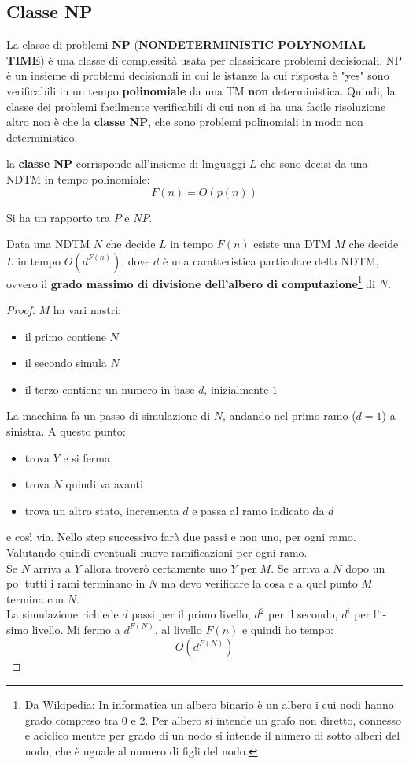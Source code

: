 \subsection{Classe NP}
La classe di problemi \textbf{NP} (\textbf{NONDETERMINISTIC POLYNOMIAL TIME}) è una classe di complessità usata per classificare problemi decisionali. NP è un insieme di problemi decisionali in cui le istanze la cui risposta è "yes" sono verificabili in un tempo \textbf{polinomiale} da una TM \textbf{non} deterministica.
Quindi, la classe dei problemi facilmente verificabili di cui non si ha una facile
risoluzione altro non è che la \textbf{classe NP}, che sono problemi polinomiali
in modo non deterministico.
\begin{definizione}
  la \textbf{classe NP} corrisponde all'insieme di linguaggi $L$ che sono decisi
  da una NDTM in tempo polinomiale:
  \[F(n)=O(p(n))\]
\end{definizione}
Si ha un rapporto tra $P$ e $NP$.
\begin{definizione}
  Data una NDTM $N$ che decide $L$ in tempo $F(n)$ esiste una DTM $M$ che decide
  $L$ in tempo $O(d^{F(n)})$, dove $d$ è una caratteristica particolare della
  NDTM, ovvero il \textbf{grado massimo di divisione dell'albero di
    computazione}\footnote{Da Wikipedia: In informatica un albero binario è un albero i cui nodi hanno grado compreso tra 0 e 2. Per albero si intende un grafo non diretto, connesso e aciclico mentre per grado di un nodo si intende il numero di sotto alberi del nodo, che è uguale al numero di figli del nodo.} di $N$. 
\end{definizione}
\begin{proof}
  $M$ ha vari nastri:
  \begin{itemize}
    \item il primo contiene $N$
    \item il secondo simula $N$
    \item il terzo contiene un numero in base $d$, inizialmente $1$
  \end{itemize}
  La macchina fa un passo di simulazione di $N$, andando nel primo ramo ($d=1$)
  a sinistra. A questo punto:
  \begin{itemize}
    \item trova $Y$ e si ferma
    \item trova $N$ quindi va avanti
    \item trova un altro stato, incrementa $d$ e passa al ramo indicato da
    $d$
  \end{itemize}
  e così via. Nello step successivo farà due passi e non uno, per ogni
  ramo. Valutando quindi eventuali nuove ramificazioni per ogni ramo. \\
  Se $N$ arriva a $Y$ allora troverò certamente uno $Y$ per $M$. Se arriva a $N$
  dopo un po' tutti i rami terminano in $N$ ma devo verificare la cosa e a quel
  punto $M$ termina con $N$.\\
  La simulazione richiede $d$ passi per il primo livello, $d^2$ per il secondo,
  $d^i$ per l'i-simo livello. Mi fermo a $d^{F(N)}$, al livello $F(n)$ e quindi
  ho tempo: 
  \[O(d^{F(N)})\]
\end{proof}

